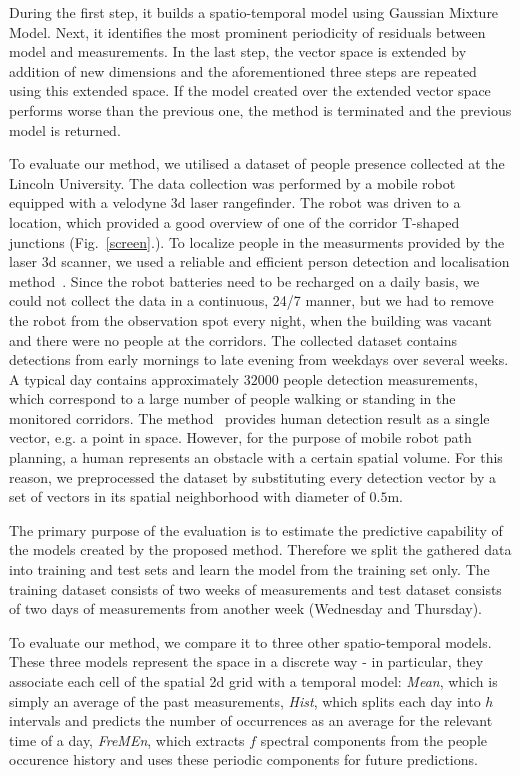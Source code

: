 During the first step, it builds a spatio-temporal model using Gaussian Mixture Model.
Next, it identifies the most prominent periodicity of residuals between model and measurements.
In the last step, the vector space is extended by addition of new dimensions and the aforementioned three steps are repeated using this extended space.
If the model created over the extended vector space performs worse than the previous one, the method is terminated and the previous model is returned. 


To evaluate our method, we utilised a dataset of people presence collected at the
Lincoln University.
The data collection was performed by a mobile robot equipped with a velodyne 3d laser rangefinder.
The robot was driven to a location, which provided a good overview of one of the corridor T-shaped junctions (Fig.~\ref{screen}.).
To localize people in the measurments provided by the laser 3d scanner, we used a reliable and efficient person detection and localisation method~\cite{yan2017online}.
Since the robot batteries need to be recharged on a daily basis, we could not collect the data in a continuous, 24/7 manner, but we had to remove the robot from the observation spot every night, when the building was vacant and there were no people at the corridors.
The collected dataset contains detections from early mornings to late evening from weekdays over several weeks.
A typical day contains approximately $32000$ people detection measurements, which correspond to a large number of people walking or standing in the monitored corridors. 
The method~\cite{yan2017online} provides human detection result as a single vector, e.g. a point in space.
However, for the purpose of mobile robot path planning, a human represents an obstacle with a certain spatial volume.
For this reason, we preprocessed the dataset by substituting every detection vector by a set of vectors in its spatial neighborhood with diameter of $0.5$m.  

The primary purpose of the evaluation is to estimate the predictive capability of the models created by the proposed method.
Therefore we split the gathered data into training and test sets and learn the model from the training set only.
The training dataset consists of two weeks of measurements and test dataset consists of two days of measurements from another week (Wednesday and Thursday).

To evaluate our method, we compare it to three other spatio-temporal models. 
These three models represent the space in a discrete way - in particular, they associate each cell of the spatial 2d grid with a temporal model: \textit{Mean}, which is simply an average of the past measurements, \textit{Hist}, which splits each day into $h$ intervals and predicts the number of occurrences as an average for the relevant time of a day, \textit{FreMEn}, which extracts $f$ spectral components from the people occurence history and uses these periodic components for future predictions.

